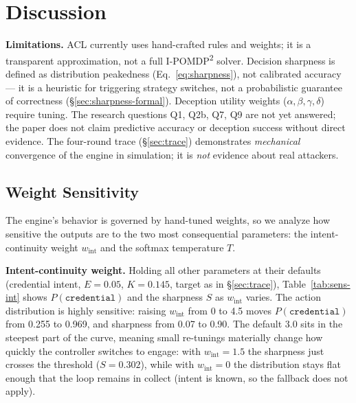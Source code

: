 \documentclass[11pt]{article}
\newcommand{\act}[1]{\texttt{#1}}
\begin{document}
\section{Discussion}
\label{sec:discussion}

\textbf{Limitations.} ACL currently uses hand-crafted rules and weights; it
is a transparent approximation, not a full I-POMDP\textsuperscript{2}
solver. Decision sharpness is defined as distribution peakedness
(Eq.~\ref{eq:sharpness}), not calibrated accuracy --- it is a heuristic for
triggering strategy switches, not a probabilistic guarantee of correctness
(\S\ref{sec:sharpness-formal}). Deception utility weights
($\alpha,\beta,\gamma,\delta$) require tuning. The research questions Q1,
Q2b, Q7, Q9 are not yet answered; the paper does not claim predictive
accuracy or deception success without direct evidence. The four-round trace
(\S\ref{sec:trace}) demonstrates \textit{mechanical} convergence of the
engine in simulation; it is \textit{not} evidence about real attackers.

\subsection{Weight Sensitivity}
\label{sec:sensitivity}

The engine's behavior is governed by hand-tuned weights, so we analyze how
sensitive the outputs are to the two most consequential parameters: the
intent-continuity weight $w_{\mathrm{int}}$ and the softmax temperature $T$.

\textbf{Intent-continuity weight.} Holding all other parameters at their
defaults (credential intent, $E=0.05$, $K=0.145$, target as in
\S\ref{sec:trace}), Table~\ref{tab:sens-int} shows $P(\act{credential})$
and the sharpness $S$ as $w_{\mathrm{int}}$ varies. The action
distribution is highly sensitive: raising $w_{\mathrm{int}}$ from 0 to 4.5
moves $P(\act{credential})$ from 0.255 to 0.969, and sharpness from 0.07
to 0.90. The default 3.0 sits in the steepest part of the curve, meaning
small re-tunings materially change how quickly the controller switches to
engage: with $w_{\mathrm{int}} = 1.5$ the sharpness just crosses the
threshold ($S = 0.302$), while with $w_{\mathrm{int}} = 0$ the distribution
stays flat enough that the loop remains in collect (intent is known, so
the fallback does not apply).
\end{document}
